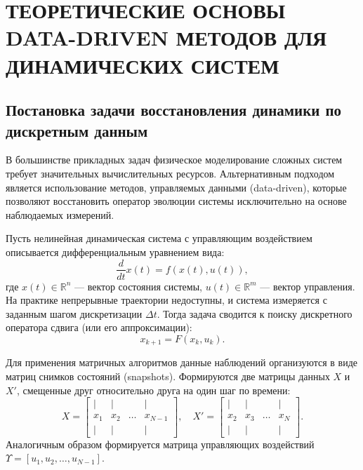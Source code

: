 \chapter{ТЕОРЕТИЧЕСКИЕ ОСНОВЫ DATA-DRIVEN МЕТОДОВ ДЛЯ ДИНАМИЧЕСКИХ СИСТЕМ}
\label{ch:theory}

\section{Постановка задачи восстановления динамики по дискретным данным}
\label{sec:problem_statement}

В большинстве прикладных задач физическое моделирование сложных систем требует значительных вычислительных ресурсов. Альтернативным подходом является использование методов, управляемых данными (data-driven), которые позволяют восстановить оператор эволюции системы исключительно на основе наблюдаемых измерений. 

Пусть нелинейная динамическая система с управляющим воздействием описывается дифференциальным уравнением вида:
\begin{equation}
\label{eq:cont_system}
\frac{d}{dt}x(t) = f(x(t), u(t)),
\end{equation}
где $x(t) \in \mathbb{R}^n$ --- вектор состояния системы, $u(t) \in \mathbb{R}^m$ --- вектор управления. На практике непрерывные траектории недоступны, и система измеряется с заданным шагом дискретизации $\Delta t$. Тогда задача сводится к поиску дискретного оператора сдвига (или его аппроксимации):
\begin{equation}
\label{eq:discrete_system}
x_{k+1} = F(x_k, u_k).
\end{equation}

Для применения матричных алгоритмов данные наблюдений организуются в виде матриц снимков состояний (snapshots). Формируются две матрицы данных $X$ и $X'$, смещенные друг относительно друга на один шаг по времени:
\begin{equation}
\label{eq:matrices_X}
X = \begin{bmatrix} | & | & & | \\ x_1 & x_2 & \dots & x_{N-1} \\ | & | & & | \end{bmatrix}, \quad
X' = \begin{bmatrix} | & | & & | \\ x_2 & x_3 & \dots & x_N \\ | & | & & | \end{bmatrix}.
\end{equation}
Аналогичным образом формируется матрица управляющих воздействий $\Upsilon = [u_1, u_2, \dots, u_{N-1}]$.

